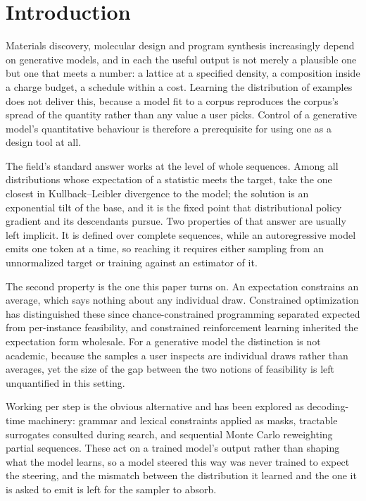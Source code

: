 \section{Introduction}
\label{sec:intro}

Materials discovery, molecular design and program synthesis increasingly depend on
generative models, and in each the useful output is not merely a plausible one but one that meets a
number: a lattice at a specified density, a composition inside a charge budget, a schedule
within a cost. Learning the distribution of examples does not deliver this, because a model
fit to a corpus reproduces the corpus's spread of the quantity rather than any value a user
picks. Control of a generative model's quantitative behaviour is therefore a prerequisite
for using one as a design tool at all.

The field's standard answer works at the level of whole sequences. Among all distributions
whose expectation of a statistic meets the target, take the one closest in
Kullback--Leibler divergence to the model; the solution is an exponential tilt of the base,
and it is the fixed point that distributional policy gradient and its
descendants pursue. Two properties of that answer are
usually left implicit. It is defined over complete sequences, while an autoregressive model
emits one token at a time, so reaching it requires either sampling from an unnormalized
target or training against an estimator of it.

The second property is the one this paper turns on. An expectation constrains an average,
which says nothing about any individual draw. Constrained optimization has distinguished these
since chance-constrained programming separated expected from per-instance feasibility, and
constrained reinforcement learning inherited the expectation form wholesale. For a generative model the distinction
is not academic, because the samples a user inspects are individual draws rather than
averages, yet the size of the gap between the two notions of feasibility is left
unquantified in this setting.

Working per step is the obvious alternative and has been explored as decoding-time
machinery: grammar and lexical constraints applied as masks, tractable surrogates
consulted during search, and sequential Monte Carlo reweighting partial
sequences. These act on a trained model's output rather than
shaping what the model learns, so a model steered this way was never trained to expect the
steering, and the mismatch between the distribution it learned and the one it is asked to
emit is left for the sampler to absorb.

